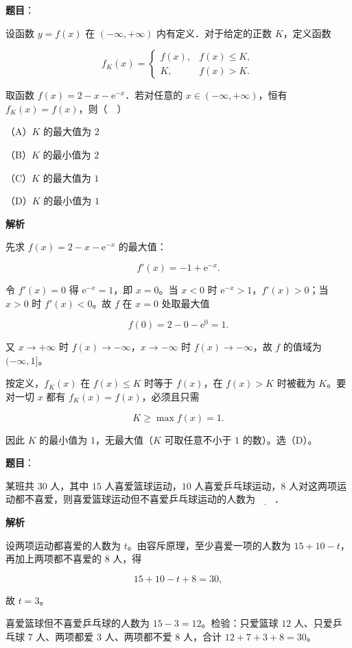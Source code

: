 \begin{answer}

\textbf{题目}：

设函数 $y=f(x)$ 在 $(-\infty,+\infty)$ 内有定义．对于给定的正数 $K$，定义函数

\nopagebreak[4]
\[f_K(x)=\begin{cases}f(x),&f(x)\leqslant K,\\ K,&f(x)>K.\end{cases}\]

取函数 $f(x)=2-x-\mathrm e^{-x}$．若对任意的 $x\in(-\infty,+\infty)$，恒有 $f_K(x)=f(x)$，则（　）

（A）$K$ 的最大值为 $2$

（B）$K$ 的最小值为 $2$

（C）$K$ 的最大值为 $1$

（D）$K$ 的最小值为 $1$

\textbf{解析}

先求 $f(x)=2-x-\mathrm e^{-x}$ 的最大值：

\nopagebreak[4]
\[f'(x)=-1+\mathrm e^{-x}.\]

令 $f'(x)=0$ 得 $\mathrm e^{-x}=1$，即 $x=0$。当 $x<0$ 时 $\mathrm e^{-x}>1$，$f'(x)>0$；当 $x>0$ 时 $f'(x)<0$。故 $f$ 在 $x=0$ 处取最大值

\nopagebreak[4]
\[f(0)=2-0-\mathrm e^0=1.\]

又 $x\to+\infty$ 时 $f(x)\to-\infty$，$x\to-\infty$ 时 $f(x)\to-\infty$，故 $f$ 的值域为 $(-\infty,1]$。

按定义，$f_K(x)$ 在 $f(x)\leqslant K$ 时等于 $f(x)$，在 $f(x)>K$ 时被截为 $K$。要对一切 $x$ 都有 $f_K(x)=f(x)$，必须且只需

\nopagebreak[4]
\[K\geqslant\max f(x)=1.\]

因此 $K$ 的最小值为 $1$，无最大值（$K$ 可取任意不小于 $1$ 的数）。选（D）。


\end{answer}
\begin{answer}

\textbf{题目}：

某班共 $30$ 人，其中 $15$ 人喜爱篮球运动，$10$ 人喜爱乒乓球运动，$8$ 人对这两项运动都不喜爱，则喜爱篮球运动但不喜爱乒乓球运动的人数为$\underline{\qquad}$．

\textbf{解析}

设两项运动都喜爱的人数为 $t$。由容斥原理，至少喜爱一项的人数为 $15+10-t$，再加上两项都不喜爱的 $8$ 人，得

\nopagebreak[4]
\[15+10-t+8=30,\]

故 $t=3$。

喜爱篮球但不喜爱乒乓球的人数为 $15-3=12$。检验：只爱篮球 $12$ 人、只爱乒乓球 $7$ 人、两项都爱 $3$ 人、两项都不爱 $8$ 人，合计 $12+7+3+8=30$。


\end{answer}
